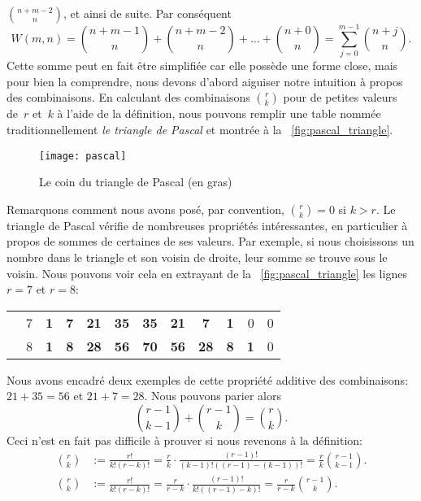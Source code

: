 \(\binom{n+m-2}{n}\), et ainsi de suite. Par conséquent
\begin{equation*}
W(m,n)
  = \binom{n+m-1}{n} + \binom{n+m-2}{n} + \dots + \binom{n+0}{n}
  = \!\sum_{j=0}^{m-1}{\!\binom{n+j}{n}}.
\end{equation*}
Cette somme peut en fait être simplifiée car elle possède une forme
close, mais pour bien la comprendre, nous devons d'abord aiguiser
notre intuition à propos des combinaisons. En calculant des
combinaisons \(\binom{r}{k}\) pour de petites valeurs de~\(r\)
et~\(k\) à l'aide de la définition, nous pouvons remplir une table
nommée traditionnellement \emph{le triangle de Pascal} et montrée à la \fig~\vref{fig:pascal_triangle}.
\begin{figure}
\centering
\texttt{[image: pascal]}
\caption{Le coin du triangle de Pascal (en gras)}
\label{fig:pascal_triangle}
\end{figure}
Remarquons comment nous avons posé, par convention, \(\binom{r}{k} =
0\) si \(k > r\). Le triangle de Pascal vérifie de nombreuses
propriétés intéressantes, en particulier à propos de sommes de
certaines de ses valeurs. Par exemple, si nous choisissons un nombre
dans le triangle et son voisin de droite, leur somme se trouve sous le
voisin. Nous pouvons voir cela en extrayant de la
\fig~\vref{fig:pascal_triangle} les lignes \(r=7\) et \(r=8\):
\begin{center}
\begin{tabular}{||c|c||rrrrrrrrrr||}
\cline{5-6}\cline{8-9}
      & 7 & \textbf{1} & \textbf{7} & \multicolumn{1}{|c}{\textbf{21}} & \multicolumn{1}{c|}{\textbf{35}} &  \textbf{35} &  \multicolumn{1}{|c}{\textbf{21}} & \multicolumn{1}{c|}{\textbf{7}} &  \textbf{1} & 0 & 0\\
\cline{5-5}\cline{8-8}
      & 8 & \textbf{1} & \textbf{8} & \textbf{28} & \multicolumn{1}{|c|}{\textbf{56}} &  \textbf{70} &  \textbf{56} & \multicolumn{1}{|c|}{\textbf{28}} &  \textbf{8} & \textbf{1} & 0\\
\cline{6-6}\cline{9-9}
\end{tabular}
\end{center}
Nous avons encadré deux exemples de cette propriété additive des
combinaisons: \(21 + 35 = 56\) et \(21 + 7 = 28\). Nous pouvons parier
alors
\begin{equation*}
\binom{r-1}{k-1} + \binom{r-1}{k} = \binom{r}{k}.
\end{equation*}
Ceci n'est en fait pas difficile à prouver si nous revenons à la
définition:
\begin{align*}
\binom{r}{k} &:= \frac{r!}{k!(r-k)!}
              = \frac{r}{k} \cdot \frac{(r-1)!}{(k-1)!((r-1)-(k-1))!}
              = \frac{r}{k} \binom{r-1}{k-1}.\\
\binom{r}{k} &:= \frac{r!}{k!(r-k)!}
              = \frac{r}{r-k} \cdot \frac{(r-1)!}{k!((r - 1) - k)!}
              = \frac{r}{r-k} \binom{r-1}{k}.
\end{align*}
